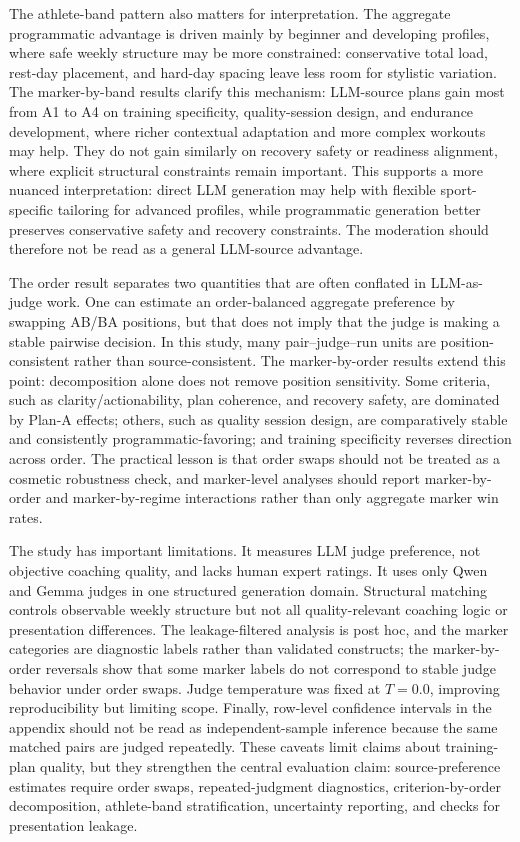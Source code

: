\documentclass[11pt]{article}
\begin{document}
The athlete-band pattern also matters for interpretation. The aggregate programmatic advantage is driven mainly by beginner and developing profiles, where safe weekly structure may be more constrained: conservative total load, rest-day placement, and hard-day spacing leave less room for stylistic variation. The marker-by-band results clarify this mechanism: LLM-source plans gain most from A1 to A4 on training specificity, quality-session design, and endurance development, where richer contextual adaptation and more complex workouts may help. They do not gain similarly on recovery safety or readiness alignment, where explicit structural constraints remain important. This supports a more nuanced interpretation: direct LLM generation may help with flexible sport-specific tailoring for advanced profiles, while programmatic generation better preserves conservative safety and recovery constraints. The moderation should therefore not be read as a general LLM-source advantage.

The order result separates two quantities that are often conflated in LLM-as-judge work. One can estimate an order-balanced aggregate preference by swapping AB/BA positions, but that does not imply that the judge is making a stable pairwise decision. In this study, many pair--judge--run units are position-consistent rather than source-consistent. The marker-by-order results extend this point: decomposition alone does not remove position sensitivity. Some criteria, such as clarity/actionability, plan coherence, and recovery safety, are dominated by Plan-A effects; others, such as quality session design, are comparatively stable and consistently programmatic-favoring; and training specificity reverses direction across order. The practical lesson is that order swaps should not be treated as a cosmetic robustness check, and marker-level analyses should report marker-by-order and marker-by-regime interactions rather than only aggregate marker win rates.

The study has important limitations. It measures LLM judge preference, not objective coaching quality, and lacks human expert ratings. It uses only Qwen and Gemma judges in one structured generation domain. Structural matching controls observable weekly structure but not all quality-relevant coaching logic or presentation differences. The leakage-filtered analysis is post hoc, and the marker categories are diagnostic labels rather than validated constructs; the marker-by-order reversals show that some marker labels do not correspond to stable judge behavior under order swaps. Judge temperature was fixed at \(T=0.0\), improving reproducibility but limiting scope. Finally, row-level confidence intervals in the appendix should not be read as independent-sample inference because the same matched pairs are judged repeatedly. These caveats limit claims about training-plan quality, but they strengthen the central evaluation claim: source-preference estimates require order swaps, repeated-judgment diagnostics, criterion-by-order decomposition, athlete-band stratification, uncertainty reporting, and checks for presentation leakage.
\end{document}
